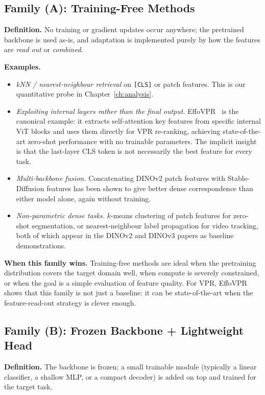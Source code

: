 \documentclass[11pt,a4paper]{article}
\begin{document}
\subsection{Family (A): Training-Free Methods}

\textbf{Definition.} No training or gradient updates occur anywhere; the
pretrained backbone is used as-is, and adaptation is implemented purely
by how the features are \emph{read out} or \emph{combined}.

\textbf{Examples.}
\begin{itemize}[leftmargin=*]
  \item \emph{kNN / nearest-neighbour retrieval} on \texttt{[CLS]} or
  patch features. This is our quantitative probe in
  Chapter~\ref{ch:analysis}.
  \item \emph{Exploiting internal layers rather than the final output.}
  EffoVPR~\citep{tzachor2024effovpr} is the canonical example: it
  extracts self-attention key features from specific internal ViT
  blocks and uses them directly for VPR re-ranking, achieving
  state-of-the-art zero-shot performance with no trainable parameters.
  The implicit insight is that the last-layer CLS token is not
  necessarily the best feature for every task.
  \item \emph{Multi-backbone fusion.} Concatenating DINOv2 patch features
  with Stable-Diffusion features has been shown to give better dense
  correspondence than either model alone, again without training.
  \item \emph{Non-parametric dense tasks.} $k$-means clustering of
  patch features for zero-shot segmentation, or nearest-neighbour label
  propagation for video tracking, both of which appear in the DINOv2
  and DINOv3 papers as baseline demonstrations.
\end{itemize}

\textbf{When this family wins.} Training-free methods are ideal when the
pretraining distribution covers the target domain well, when compute is
severely constrained, or when the goal is a simple evaluation of feature
quality. For VPR, EffoVPR shows that this family is not just a baseline:
it can be state-of-the-art when the feature-read-out strategy is clever
enough.

\subsection{Family (B): Frozen Backbone + Lightweight Head}

\textbf{Definition.} The backbone is frozen; a small trainable module
(typically a linear classifier, a shallow MLP, or a compact decoder) is
added on top and trained for the target task.
\end{document}
